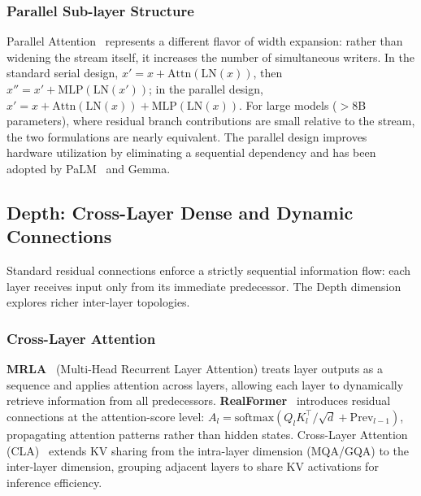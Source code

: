 \subsubsection{Parallel Sub-layer Structure}

Parallel Attention~\cite{wang2021gptj,chowdhery2022palm} represents a different flavor of width expansion: rather than widening the stream itself, it increases the number of simultaneous writers. In the standard serial design, $x' = x + \mathrm{Attn}(\mathrm{LN}(x))$, then $x'' = x' + \mathrm{MLP}(\mathrm{LN}(x'))$; in the parallel design, $x' = x + \mathrm{Attn}(\mathrm{LN}(x)) + \mathrm{MLP}(\mathrm{LN}(x))$. For large models ($>$8B parameters), where residual branch contributions are small relative to the stream, the two formulations are nearly equivalent. The parallel design improves hardware utilization by eliminating a sequential dependency and has been adopted by PaLM~\cite{chowdhery2022palm} and Gemma.

\subsection{Depth: Cross-Layer Dense and Dynamic Connections}
\label{subsec:residual_depth}

Standard residual connections enforce a strictly sequential information flow: each layer receives input only from its immediate predecessor. The Depth dimension explores richer inter-layer topologies.

\subsubsection{Cross-Layer Attention}

\textbf{MRLA}~\cite{fang2023cross} (Multi-Head Recurrent Layer Attention) treats layer outputs as a sequence and applies attention across layers, allowing each layer to dynamically retrieve information from all predecessors. \textbf{RealFormer}~\cite{he2020realformer} introduces residual connections at the attention-score level: $A_l = \mathrm{softmax}(Q_l K_l^\top / \sqrt{d} + \mathrm{Prev}_{l-1})$, propagating attention patterns rather than hidden states. Cross-Layer Attention (CLA)~\cite{brandon2024reducing} extends KV sharing from the intra-layer dimension (MQA/GQA) to the inter-layer dimension, grouping adjacent layers to share KV activations for inference efficiency.

